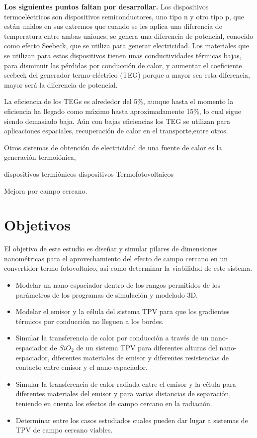\textbf{Los siguientes puntos faltan por desarrollar.}
Los dispositivos termoeléctricos son dispositivos semiconductores, uno tipo n y otro tipo p, que están unidos en sus extremos que cuando se les aplica una diferencia de temperatura entre ambas uniones, se genera una diferencia de potencial, conocido como efecto Seebeck, que se utiliza para generar electricidad. Los materiales que se utilizan para estos dispositivos tienen unas conductividades térmicas bajas, para disminuir las pérdidas por conducción de calor, y aumentar el coeficiente seebeck del generador termo-eléctrico (TEG) porque a mayor sea esta diferencia, mayor será la diferencia de potencial.

La eficiencia de los TEGs es alrededor del 5\%, aunque hasta el momento la eficiencia ha llegado como máximo hasta aproximadamente 15\%, lo cual sigue siendo demasiado baja. Aún con bajas eficiencias los TEG se utilizan para aplicaciones espaciales, recuperación de calor en el transporte,entre otros.


Otros sistemas de obtención de electricidad de una fuente de calor es la generación termoiónica,

dispositivos termiónicos
dispositivos Termofotovoltaicos

Mejora por campo cercano.




\section{Objetivos}
El objetivo de este estudio es diseñar y simular pilares de dimensiones nanométricas para el aprovechamiento del efecto de campo cercano en un convertidor termo-fotovoltaico, así como determinar la viabilidad de este sistema. 
\begin{itemize}
	\item Modelar un nano-espaciador dentro de los rangos permitidos de los parámetros de los programas de simulación y modelado 3D.
	\item Modelar el emisor y la célula del sistema TPV para que los gradientes térmicos por conducción no lleguen a los bordes.
	\item Simular la transferencia de calor por conducción a través de un nano-espaciador de $SiO_2$ de un sistema TPV para diferentes alturas del nano-espaciador, diferentes materiales de emisor y diferentes resistencias de contacto entre emisor y el nano-espaciador.
	\item Simular la transferencia de calor radiada entre el emisor y la célula para diferentes materiales del emisor y para varias distancias de separación, teniendo en cuenta los efectos de campo cercano en la radiación.
	\item Determinar entre los casos estudiados cuales pueden dar lugar a sistemas de TPV de campo cercano viables.
\end{itemize}


